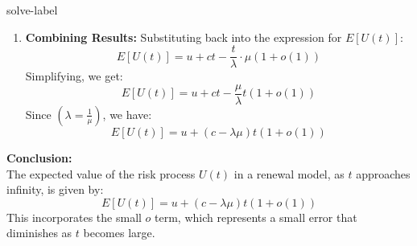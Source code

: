 \begin{solve}{}{solve-label}
\begin{enumerate}
		\item \textbf{Combining Results:}
		\subitem Substituting back into the expression for \( E[U(t)] \):
		$$E[U(t)] = u + ct - \frac{t}{\lambda} \cdot \mu (1 + o(1))$$
		\subitem Simplifying, we get:
		$$E[U(t)] = u + ct - \frac{\mu}{\lambda} t (1 + o(1))$$
		\subitem Since $(\lambda = \frac{1}{\mu})$, we have:
		$$E[U(t)] = u + (c - \lambda \mu)t (1 + o(1))$$
	\end{enumerate}
		\textbf{Conclusion:}\\
		The expected value of the risk process \( U(t) \) in a renewal model, as \( t \) approaches infinity, is given by:
		$$E[U(t)] = u + (c - \lambda \mu)t (1 + o(1))$$
		This incorporates the small \( o \) term, which represents a small error that diminishes as \( t \) becomes large. \cite{r1,r2,r3,r4,r5}
	\end{solve}
	
	
	
	
	
